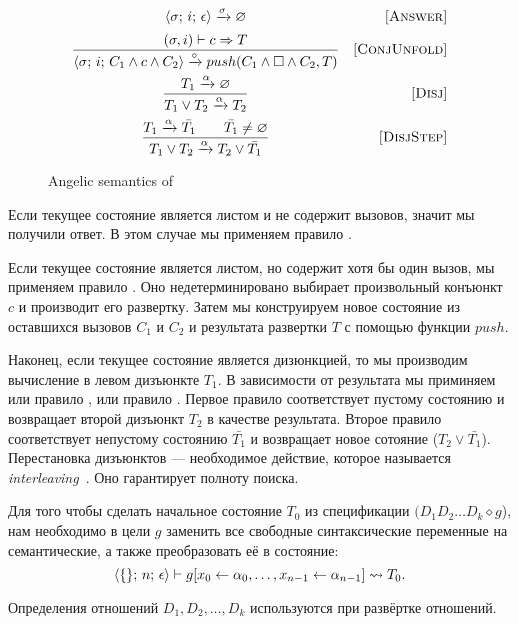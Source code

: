 \begin{figure}[h!]
\[\begin{array}{cr}
     {\langle \sigma;\, i;\, \epsilon \rangle \xrightarrow{\sigma} \varnothing}  
&     \mbox{[\textsc{Answer}]} \\[2mm]
\dfrac{(\sigma, i) \vdash c \Rightarrow T}
      {\langle \sigma;\, i;\, C_1 \land c \land C_2 \rangle \xrightarrow{\circ} push(C_1 \land \Box \land C_2, T)}
&     \mbox{[\textsc{ConjUnfold}]} \\[4mm]
\dfrac{T_1 \xrightarrow{\alpha} \varnothing}
      {T_1 \lor T_2 \xrightarrow{\alpha} T_2}
&     \mbox{[\textsc{Disj}]} \\[4mm]
\dfrac{T_1 \xrightarrow{\alpha} \bar{T_1} \qquad \bar{T_1} \not= \varnothing}
      {T_1 \lor T_2 \xrightarrow{\alpha} T_2 \lor\bar{T_1}}
&     \mbox{[\textsc{DisjStep}]}
\end{array}\]
\caption{Angelic semantics of \mk}
\label{fair:classic-semantics}
\end{figure}

Если текущее состояние является листом и не содержит вызовов, значит мы получили ответ. В этом случае мы применяем правило .

Если текущее состояние является листом, но содержит хотя бы один вызов, мы применяем правило . Оно недетерминировано выбирает произвольный конъюнкт $c$ и производит его развертку. Затем мы конструируем новое состояние из оставшихся вызовов $C_1$ и $C_2$ и результата развертки $T$ с помощью функции $push$.


Наконец, если текущее состояние является дизюнкцией, то мы производим вычисление в левом дизъюнкте $T_1$. В зависимости от результата мы приминяем или правило , или правило . Первое правило соответствует пустому состоянию и возвращает второй дизъюнкт $T_2$ в качестве результата. Второе правило соответствует непустому состоянию $\bar{T_1}$ и возвращает новое сотояние ($T_2 \lor \bar{T_1}$). Перестановка дизъюнктов --- необходимое действие, которое называется \emph{interleaving}~\cite{fair:interleaving}. Оно гарантирует полноту поиска.

Для того чтобы сделать начальное состояние $T_0$ из спецификации $(D_1 D_2\ldots D_k \diamond g$), нам необходимо в цели $g$ заменить все свободные синтаксические переменные на семантические, а также преобразовать её в состояние:
\[
{\langle \{\};\, n;\, \epsilon \rangle \vdash g[x_0 \leftarrow \alpha_0, \ldots, x_{n-1} \leftarrow \alpha_{n-1}]} \leadsto T_0.
\]

\noindent Определения отношений $D_1, D_2, \ldots, D_k$ используются при развёртке отношений.

